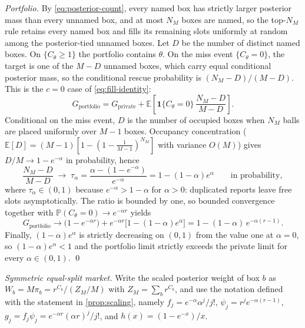 \documentclass[11pt]{article}
\theoremstyle{definition}
\theoremstyle{remark}
\newcommand{\E}{\mathbb{E}}
\newcommand{\Prob}{\mathbb{P}}
\newcommand{\1}{\mathbf{1}}
\newcommand{\priv}{\mathrm{private}}
\begin{document}
\emph{Portfolio.} By \cref{eq:posterior-count}, every named box has strictly larger posterior mass than every unnamed box, and at most $N_M$ boxes are named, so the top-$N_M$ rule retains every named box and fills its remaining slots uniformly at random among the posterior-tied unnamed boxes. Let $D$ be the number of distinct named boxes. On $\{C_\theta\ge1\}$ the portfolio contains $\theta$. On the miss event $\{C_\theta=0\}$, the target is one of the $M-D$ unnamed boxes, which carry equal conditional posterior mass, so the conditional rescue probability is $(N_M-D)/(M-D)$. This is the $c=0$ case of \cref{eq:fill-identity}:
\[
G_{\mathrm{portfolio}}
=G_{\priv}+\E\!\left[\1\{C_\theta=0\}\,\frac{N_M-D}{M-D}\right].
\]
Conditional on the miss event, $D$ is the number of occupied boxes when $N_M$ balls are placed uniformly over $M-1$ boxes. Occupancy concentration ($\E[D]=(M-1)[1-(1-\tfrac{1}{M-1})^{N_M}]$ with variance $O(M)$) gives $D/M\to1-e^{-\alpha}$ in probability, hence
\[
\frac{N_M-D}{M-D}
\;\longrightarrow\;
\tau_\alpha
=\frac{\alpha-(1-e^{-\alpha})}{e^{-\alpha}}
=1-(1-\alpha)e^{\alpha}
\qquad\text{in probability},
\]
where $\tau_\alpha\in(0,1)$ because $e^{-\alpha}>1-\alpha$ for $\alpha>0$: duplicated reports leave free slots asymptotically. The ratio is bounded by one, so bounded convergence together with $\Prob(C_\theta=0)\to e^{-\alpha r}$ yields
\[
G_{\mathrm{portfolio}}
\longrightarrow
\bigl(1-e^{-\alpha r}\bigr)+e^{-\alpha r}\bigl[1-(1-\alpha)e^{\alpha}\bigr]
=1-(1-\alpha)\,e^{-\alpha(r-1)}.
\]
Finally, $(1-\alpha)e^{\alpha}$ is strictly decreasing on $(0,1)$ from the value one at $\alpha=0$, so $(1-\alpha)e^{\alpha}<1$ and the portfolio limit strictly exceeds the private limit for every $\alpha\in(0,1)$. \qed

\emph{Symmetric equal-split market.} Write the scaled posterior weight of box $b$ as $W_b=M\pi_b=r^{C_b}/(Z_M/M)$ with $Z_M=\sum_b r^{C_b}$, and use the notation defined with the statement in \cref{prop:scaling}, namely $f_j=e^{-\alpha}\alpha^j/j!$, $\psi_j=r^je^{-\alpha(r-1)}$, $g_j=f_j\psi_j=e^{-\alpha r}(\alpha r)^j/j!$, and $h(x)=(1-e^{-x})/x$.
\end{document}
